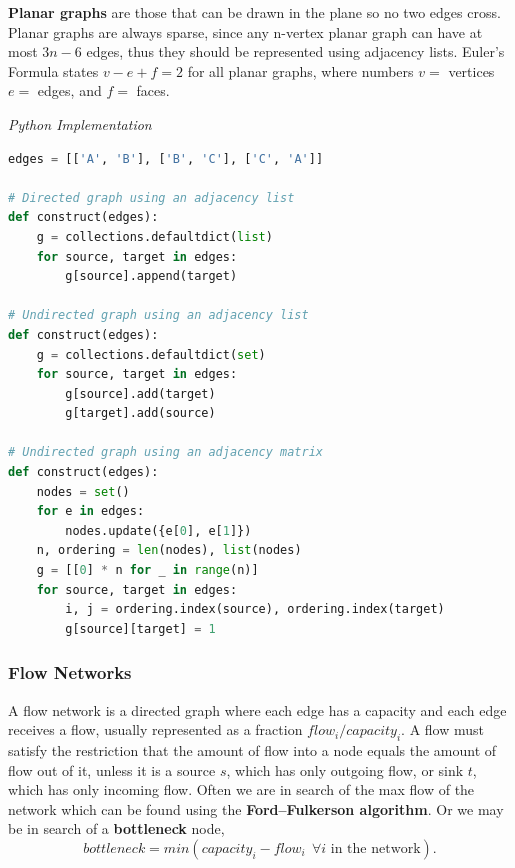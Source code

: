 \documentclass{article}
\begin{document}
    \textbf{Planar graphs} are those that can be drawn in the plane so no two edges cross. Planar graphs are always sparse, since any n-vertex planar graph can have at most $3n - 6$ edges, thus they should be represented using adjacency lists. Euler's Formula states $v-e+f=2$ for all planar graphs, where numbers $v = $ vertices $e = $ edges, and $f = $ faces.

\vspace{8pt} \emph{Python Implementation}
\begin{lstlisting}[language=Python]
edges = [['A', 'B'], ['B', 'C'], ['C', 'A']]

# Directed graph using an adjacency list
def construct(edges):
    g = collections.defaultdict(list)
    for source, target in edges:
        g[source].append(target)
        
# Undirected graph using an adjacency list
def construct(edges):
    g = collections.defaultdict(set)
    for source, target in edges:
        g[source].add(target)
        g[target].add(source)
        
# Undirected graph using an adjacency matrix
def construct(edges):
    nodes = set()
    for e in edges:
        nodes.update({e[0], e[1]})
    n, ordering = len(nodes), list(nodes)
    g = [[0] * n for _ in range(n)]
    for source, target in edges:
        i, j = ordering.index(source), ordering.index(target)
        g[source][target] = 1
\end{lstlisting}

\subsubsection{Flow Networks}

A flow network is a directed graph where each edge has a capacity and each edge receives a flow, usually represented as a fraction $flow_i/capacity_i$. A flow must satisfy the restriction that the amount of flow into a node equals the amount of flow out of it, unless it is a source $s$, which has only outgoing flow, or sink $t$, which has only incoming flow. Often we are in search of the max flow of the network which can be found using the \textbf{Ford–Fulkerson algorithm}. Or we may be in search of a \textbf{bottleneck} node, 
\[
    bottleneck = min(capacity_i - flow_i \ \ \forall i  \text{ in the network}).
\]
\end{document}
